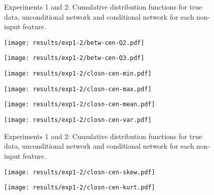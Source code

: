 \begin{figure}[ht]
	
	\caption[Graphical results for experiments 1 and 2]{Experiments 1 and 2: Cumulative distribution functions for true data, unconditional network and conditional network for each non-input feature.}
\end{figure}\begin{figure}[ht]
	\begin{minipage}[b]{0.45\linewidth}
		\centering
		\texttt{[image: results/exp1-2/betw-cen-Q2.pdf]} 
		\label{fig:results-noninput-betw-cen-Q2}
	\end{minipage}
	\begin{minipage}[b]{0.45\linewidth}
		\centering
		\texttt{[image: results/exp1-2/betw-cen-Q3.pdf]} 
		\label{fig:results-noninput-betw-cen-Q3}
	\end{minipage} 
	
	
	\begin{minipage}[b]{0.45\linewidth}
		\centering
		\texttt{[image: results/exp1-2/closn-cen-min.pdf]} 
		\label{fig:results-noninput-closn-cen-min}
	\end{minipage}
	\begin{minipage}[b]{0.45\linewidth}
		\centering
		\texttt{[image: results/exp1-2/closn-cen-max.pdf]} 
		\label{fig:results-noninput-closn-cen-max}
	\end{minipage} 
	
	
	\begin{minipage}[b]{0.45\linewidth}
		\centering
		\texttt{[image: results/exp1-2/closn-cen-mean.pdf]} 
		\label{fig:results-noninput-closn-cen-mean}
	\end{minipage}
	\begin{minipage}[b]{0.45\linewidth}
		\centering
		\texttt{[image: results/exp1-2/closn-cen-var.pdf]} 
		\label{fig:results-noninput-closn-cen-var}
	\end{minipage} 
	
	
	\caption[Graphical results for experiments 1 and 2]{Experiments 1 and 2: Cumulative distribution functions for true data, unconditional network and conditional network for each non-input feature.}
\end{figure}\begin{figure}[ht]
	\begin{minipage}[b]{0.45\linewidth}
		\centering
		\texttt{[image: results/exp1-2/closn-cen-skew.pdf]} 
		\label{fig:results-noninput-closn-cen-skew}
	\end{minipage}
	\begin{minipage}[b]{0.45\linewidth}
		\centering
		\texttt{[image: results/exp1-2/closn-cen-kurt.pdf]} 
		\label{fig:results-noninput-closn-cen-kurt}
	\end{minipage} 
	

\end{figure}
